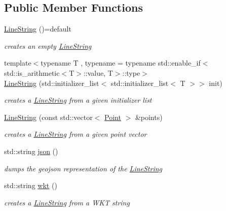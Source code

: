 \subsection*{Public Member Functions}
\begin{DoxyCompactItemize}
\item 
\hyperlink{classsimo_1_1shapes_1_1_line_string_ad7af05e6ab868386d3166f81288f7f1c}{Line\-String} ()=default
\begin{DoxyCompactList}\small\item\em creates an empty \hyperlink{classsimo_1_1shapes_1_1_line_string}{Line\-String} \end{DoxyCompactList}\item 
{\footnotesize template$<$typename T , typename  = typename std\-::enable\-\_\-if$<$std\-::is\-\_\-arithmetic$<$\-T$>$\-::value, T$>$\-::type$>$ }\\\hyperlink{classsimo_1_1shapes_1_1_line_string_a25e70d3ca2488e80615bdc0278b231ad}{Line\-String} (std\-::initializer\-\_\-list$<$ std\-::initializer\-\_\-list$<$ T $>$$>$ init)
\begin{DoxyCompactList}\small\item\em creates a \hyperlink{classsimo_1_1shapes_1_1_line_string}{Line\-String} from a given initializer list \end{DoxyCompactList}\item 
\hyperlink{classsimo_1_1shapes_1_1_line_string_a39159fdb1516ed409801499756d627a5}{Line\-String} (const std\-::vector$<$ \hyperlink{classsimo_1_1shapes_1_1_point}{Point} $>$ \&points)
\begin{DoxyCompactList}\small\item\em creates a \hyperlink{classsimo_1_1shapes_1_1_line_string}{Line\-String} from a given point vector \end{DoxyCompactList}\item 
std\-::string \hyperlink{classsimo_1_1shapes_1_1_line_string_a59c052bc895234b68aec25c7d6428e03}{json} ()
\begin{DoxyCompactList}\small\item\em dumps the geojson representation of the \hyperlink{classsimo_1_1shapes_1_1_line_string}{Line\-String} \end{DoxyCompactList}\item 
std\-::string \hyperlink{classsimo_1_1shapes_1_1_line_string_a2e27662b671d0e92df982675f2396492}{wkt} ()
\begin{DoxyCompactList}\small\item\em creates a \hyperlink{classsimo_1_1shapes_1_1_line_string}{Line\-String} from a W\-K\-T string \end{DoxyCompactList}\end{DoxyCompactItemize}
